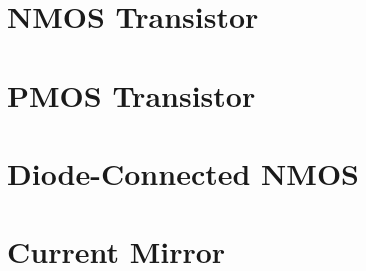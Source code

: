 \documentclass{article}
\begin{document}
\begin{titlepage}

\end{titlepage}
\section{NMOS Transistor}

\section{PMOS Transistor}

\section{Diode-Connected NMOS}

\section{Current Mirror}



\end{document}
